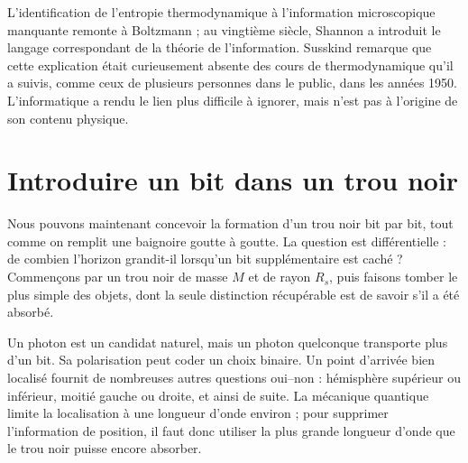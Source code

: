 L’identification de l’entropie thermodynamique à l’information microscopique manquante remonte à Boltzmann ; au vingtième siècle, Shannon a introduit le langage correspondant de la théorie de l’information. Susskind remarque que cette explication était curieusement absente des cours de thermodynamique qu’il a suivis, comme ceux de plusieurs personnes dans le public, dans les années 1950. L’informatique a rendu le lien plus difficile à ignorer, mais n’est pas à l’origine de son contenu physique.

\section{Introduire un bit dans un trou noir}

Nous pouvons maintenant concevoir la formation d’un trou noir bit par bit, tout comme on remplit une baignoire goutte à goutte. La question est différentielle : de combien l’horizon grandit-il lorsqu’un bit supplémentaire est caché ? Commençons par un trou noir de masse \(M\) et de rayon \(R_s\), puis faisons tomber le plus simple des objets, dont la seule distinction récupérable est de savoir s’il a été absorbé.

\begin{classroomqa}
\end{classroomqa}

Un photon est un candidat naturel, mais un photon quelconque transporte plus d’un bit. Sa polarisation peut coder un choix binaire. Un point d’arrivée bien localisé fournit de nombreuses autres questions oui--non : hémisphère supérieur ou inférieur, moitié gauche ou droite, et ainsi de suite. La mécanique quantique limite la localisation à une longueur d’onde environ ; pour supprimer l’information de position, il faut donc utiliser la plus grande longueur d’onde que le trou noir puisse encore absorber.

\begin{classroomqa}
\end{classroomqa}

